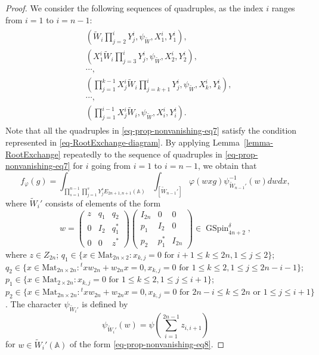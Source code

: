\documentclass[12pt]{amsart}
\newcommand{\A}{\mathbb{A}}
\newcommand{\wt}{\widetilde}
\theoremstyle{remark}
\DeclareMathOperator{\GSpin}{GSpin}
\begin{document}
\begin{proof}
We consider the following sequences of quadruples, as the index $i$ ranges from $i=1$ to $i=n-1$:
\begin{align}\label{eq-prop-nonvanishing-eq7}
\begin{split}
& (\wt{W}_i \prod_{j=2}^i Y^i_j, \psi_{\wt{W}}, X^i_1, Y^i_1),\\
& (X^i_1 \wt{W}_i \prod_{j=3}^i Y^i_j, \psi_{\wt{W}}, X^i_2, Y^i_2),\\
& \cdots,\\
& (\prod_{j=1}^{k-1} X^i_j \wt{W}_i \prod_{j=k+1}^i Y^i_j, \psi_{\wt{W}}, X^i_k, Y^i_k),\\
& \cdots,\\
& (\prod_{j=1}^{i-1} X^i_j \wt{W}_i, \psi_{\wt{W}}, X^i_{i}, Y^i_{i}).
\end{split}
\end{align}
Note that all the quadruples in \eqref{eq-prop-nonvanishing-eq7} satisfy the condition represented in \eqref{eq-RootExchange-diagram}. 
By applying Lemma~\ref{lemma-RootExchange} repeatedly to the sequence of quadruples in \eqref{eq-prop-nonvanishing-eq7} for $i$ going from $i=1$ to $i=n-1$, we obtain that
\begin{equation*}
f_{\varphi}(g)=\int_{\prod_{s=1}^{n-1} \prod_{j=1}^s Y^s_j
E_{2n+1,n+1}
(\A)}\int_{[\wt{W}_{n-1}']} \varphi(wxg) \psi^{-1}_{\wt{W}_{n-1}'}(w)dwdx,
\end{equation*}
where $\wt{W}_{i}'$ consists of elements of the form
\begin{equation}
\label{eq-prop-nonvanishing-eq8}
w=\begin{pmatrix}
z & q_1 & q_2\\
0 & I_2 & q_1^*\\
0 & 0 & z^*
\end{pmatrix}\begin{pmatrix}
I_{2n} & 0 & 0\\
p_1& I_2 & 0\\
p_2 &p_1^*& I_{2n}
\end{pmatrix} \in \GSpin^{\delta}_{4n+2},
\end{equation}
where $z \in Z_{2n}$; $q_1 \in \{x\in \mathrm{Mat}_{2n \times 2}: x_{k,j}=0 \text{ for } i+1 \leq k \leq 2n, 1 \leq j \leq 2 \}$;
$q_2\in \{x\in \mathrm{Mat}_{2n\times 2n}: {}^t x w_{2n}+w_{2n}x=0, x_{k,j}=0 \text{ for }1\le k\le 2, 1\le j \le 2n-i-1 \}$;
$p_1 \in \{ x\in \mathrm{Mat}_{2 \times 2n}: x_{k,j}=0 \text{ for }1 \leq k \leq 2, 1 \leq j \leq i+1 \}$; 
$p_2\in \{x\in \mathrm{Mat}_{2n\times 2n}: {}^t x w_{2n}+w_{2n}x=0, x_{k,j}=0 \text{ for }2n-i\le k \le 2n \text{ or } 1\le j \le i+1 \}$.
The character $\psi_{\wt{W}_{i}'}$ is defined by
\begin{equation*}
	\psi_{\wt{W}_{i}'}(w)=\psi(\sum_{i=1}^{2n-1} z_{i,i+1})
\end{equation*}
for $w\in \wt{W}_{i}'(\A)$ of the form \eqref{eq-prop-nonvanishing-eq8}.


\end{proof}
\end{document}
